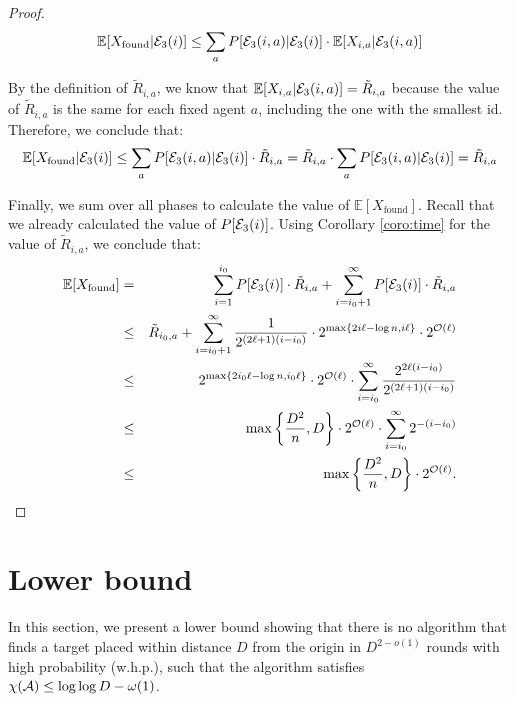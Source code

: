 \documentclass[11pt]{article}
\newcommand{\E}{\mathbb{E}}
\newcommand{\BO}{\mathcal{O}}
\begin{document}
\begin{proof}
\begin{equation*}
\E[X_{\text{found}}| {\cal E}_3(i)] \leq \sum_{a} P[{\cal E}_3(i,a) | {\cal E}_3(i)] \cdot \E[X_{i,a} | {\cal E}_3(i,a)]
\end{equation*}

By the definition of $\tilde{R}_{i,a}$, we know that $\E[X_{i,a} | {\cal E}_3(i,a)] = \tilde{R}_{i,a}$ because the value of $\tilde{R}_{i,a}$ is the same for each fixed agent $a$, including the one with the smallest id. Therefore, we conclude that:
\begin{equation*}
	\E[X_{\text{found}}| {\cal E}_3(i)] \leq  \sum_{a} P[{\cal E}_3(i,a) | {\cal E}_3(i)] \cdot \tilde{R}_{i,a} = \tilde{R}_{i,a}  \cdot \sum_{a} P[{\cal E}_3(i,a) | {\cal E}_3(i)] = \tilde{R}_{i,a} 
\end{equation*}

Finally, we sum over all phases to calculate the value of $\E[X_{\text{found}}]$. Recall that we already calculated the value of $P[{\cal E}_3(i)]$. Using Corollary \ref{coro:time} for the value of $\tilde{R}_{i,a}$, we conclude that:
\begin{eqnarray*}
\E[X_{\text{found}}] &=& \sum_{i=1}^{i_0} P[{\cal E}_3(i)]\cdot \tilde{R}_{i,a} + \sum_{i=i_0+1}^{\infty} P[{\cal E}_3(i)]\cdot \tilde{R}_{i,a} \\
&\leq & \tilde{R}_{i_0,a} + \sum_{i=i_0+1}^{\infty} \frac{1}{2^{(2\ell+1)(i-i_0)}}\cdot 2^{\max\{2i\ell-\log n,i\ell\}}\cdot 2^{\BO(\ell)}\\
&\leq &  2^{\max\{2i_0\ell-\log n,i_0\ell\}}\cdot 2^{\BO(\ell)}\cdot \sum_{i=i_0}^{\infty} \frac{2^{2\ell(i-i_0)}}{2^{(2\ell+1)(i-i_0)}} \\
&\leq & \max\left\{\frac{D^2}{n},D\right\}\cdot 2^{\BO(\ell)}\cdot \sum_{i=i_0}^{\infty} 2^{-(i-i_0)}\\
&\leq & \max\left\{\frac{D^2}{n},D\right\}\cdot 2^{\BO(\ell)}.
\end{eqnarray*}
\vspace*{-1.35cm}

\qedhere
\end{proof}


\section{Lower bound}
\label{sec:lower}

In this section, we present a lower bound showing that there is no algorithm that finds a target placed within distance $D$ from the origin in $D^{2-o(1)}$ rounds with high probability (w.h.p.), such that the algorithm satisfies $\chi({\cal A}) \leq \log \log D - \omega(1)$. 
\end{document}
